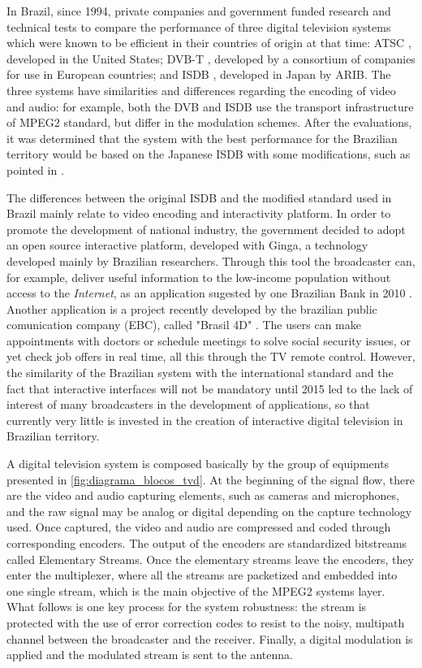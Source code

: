 \documentclass[
	12pt,				%
	openright,			%
	twoside,			%
	a4paper,			%
	brazil,
	french,				%
	english
	]{abntex2}
\begin{document}
In Brazil, since 1994, private companies and government funded research and technical tests to compare the performance of three digital television systems which were known to be efficient in their countries of origin at that time: ATSC \cite{ATSC}, developed in the United States; DVB-T \cite{DVB}, developed by a consortium of companies for use in European countries; and ISDB , developed in Japan by ARIB\cite{ARIB}. The three systems have similarities and differences regarding the encoding of video and audio: for example, both the DVB and ISDB use the transport infrastructure of MPEG2 standard, but differ in the modulation schemes. After the evaluations, it was determined that the system with the best performance for the Brazilian territory would be based on the Japanese ISDB with some modifications, such as pointed in \cite{decreto8061}.

The differences between the original ISDB and the modified standard used in Brazil mainly relate to video encoding and interactivity platform. In order to promote the development of national industry, the government decided to adopt an open source interactive platform, developed with Ginga, a technology developed mainly by Brazilian researchers\cite{PUCRJ}. Through this tool the broadcaster can, for example, deliver useful information to the low-income population without access to the \textit{Internet}, as an application sugested by one Brazilian Bank in 2010 \cite{caixa}. Another application is a project recently developed by the brazilian public comunication company (EBC), called "Brasil 4D" \cite{consultas}. The users can make appointments with doctors or schedule meetings to solve social security issues, or yet check job offers in real time, all this through the TV remote control. However, the similarity of the Brazilian system with the international standard and the fact that interactive interfaces will not be mandatory until 2015 led to the lack of interest of many broadcasters in the development of applications, so that currently very little is invested in the creation of interactive digital television in Brazilian territory.

A digital television system is composed basically by the group of equipments presented in \autoref{fig:diagrama_blocos_tvd}. At the beginning of the signal flow, there are the video and audio capturing elements, such as cameras and microphones, and the raw signal may be analog or digital depending on the capture technology used. Once captured, the video and audio are compressed and coded through corresponding encoders. The output of the encoders are standardized bitstreams called Elementary Streams. Once the elementary streams leave the encoders, they enter the multiplexer, where all the streams are packetized and embedded into one single stream, which is the main objective of the MPEG2 systems layer. What follows is one key process for the system robustness: the stream is protected with the use of error correction codes to resist to the noisy, multipath channel between the broadcaster and the receiver. Finally, a digital modulation is applied and the modulated stream is sent to the antenna.
 
\end{document}
